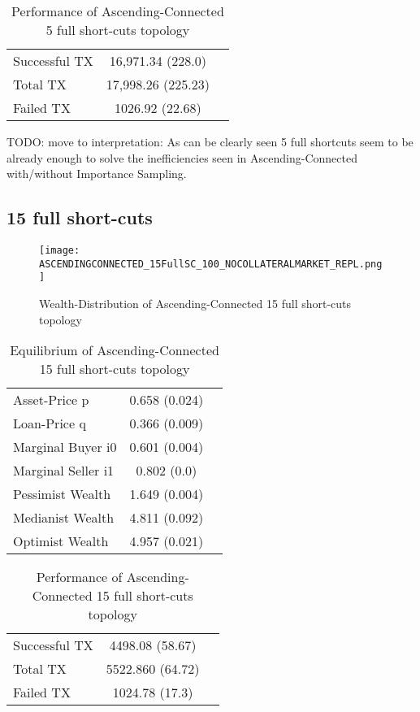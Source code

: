 \documentclass[Bachelorarbeit.tex]{subfiles}
\begin{document}
\begin{table}[h]
	\caption{Performance of Ascending-Connected 5 full short-cuts topology}
	\centering
	\begin{tabular} { l c r }
		\hline
		Successful TX & 16,971.34 (228.0) \\
		Total TX & 17,998.26 (225.23) \\
		Failed TX & 1026.92 (22.68) \\
		\hline
	\end{tabular}
\end{table}

TODO: move to interpretation: As can be clearly seen 5 full shortcuts seem to be already enough to solve the inefficiencies seen in Ascending-Connected with/without Importance Sampling.

\subsection{15 full short-cuts}
\begin{figure}[H]
	\centering
  \texttt{[image: ASCENDINGCONNECTED\_15FullSC\_100\_NOCOLLATERALMARKET\_REPL.png]}
	\caption{Wealth-Distribution of Ascending-Connected 15 full short-cuts topology}
	\label{fig:wealth_ASCENDINGCONNECTED_15FullSC_100_NOCOLLATERALMARKET_REPL}
\end{figure}

\begin{table}[h]
	\caption{Equilibrium of Ascending-Connected 15 full short-cuts topology}
	\centering
	\begin{tabular} { l c r }
		\hline
		Asset-Price p & 0.658 (0.024) \\
		Loan-Price q & 0.366 (0.009) \\
		Marginal Buyer i0 & 0.601 (0.004) \\
		Marginal Seller i1 & 0.802 (0.0) \\
		\hline
		Pessimist Wealth & 1.649 (0.004) \\
		Medianist Wealth & 4.811 (0.092) \\
		Optimist Wealth & 4.957 (0.021) \\
		\hline
	\end{tabular}
\end{table} 

\begin{table}[H]
	\caption{Performance of Ascending-Connected 15 full short-cuts topology}
	\centering
	\begin{tabular} { l c r }
		\hline
		Successful TX & 4498.08 (58.67) \\
		Total TX & 5522.860 (64.72) \\
		Failed TX & 1024.78 (17.3) \\
		\hline
	\end{tabular}
\end{table}
\end{document}
